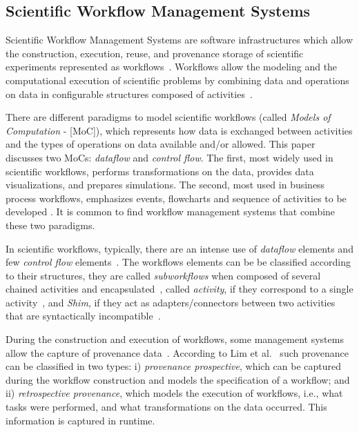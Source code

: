 \documentclass{sig-alternate-05-2015}
\begin{document}
\subsection{Scientific Workflow Management Systems}\label{SISTEMASGERENCIADORESWORKFLOWCIENTIFICO}
Scientific Workflow Management Systems are software infrastructures which allow the construction, execution, reuse, and provenance storage of scientific experiments represented as workflows~\cite{McPhillips2009}. Workflows allow the modeling and the computational execution of scientific problems by combining data and operations on data in configurable structures composed of activities~\cite{Garijo2014}.

There are different paradigms to model scientific workflows (called \emph{Models of Computation} - [MoC]), which represents how data is exchanged between activities and the types of operations on data available and/or allowed. This paper discusses two MoCs: \emph{dataflow} and \emph{control flow}. The first, most widely used in scientific workflows, performs transformations on the data, provides data visualizations, and prepares simulations. The second, most used in business process workflows, emphasizes events, flowcharts and sequence of activities to be developed \cite{Ludascher2006}. It is common to find workflow management systems that combine these two paradigms.

In scientific workflows, typically, there are an intense use of \emph{dataflow} elements and few \emph{control flow} elements~\cite{Ludascher2006}. The workflows elements can be be classified according to their structures, they are called \emph{subworkflows} when composed of several chained activities and encapsulated~\cite{medeiros_woodss_2005}, called \emph{activity}, if they correspond to a single activity~\cite{Garijo2012}, and \emph{Shim}, if they act as adapters/connectors between two activities that are syntactically incompatible~\cite{Lin2009}.

During the construction and execution of workflows, some management systems allow the capture of provenance data~\cite{ Zeng2011}. According to Lim et al.~\cite{Lim2010} such provenance can be classified in two types: i) \emph{provenance prospective}, which can be captured during the workflow construction and models the specification of a workflow; and ii) \emph{retrospective provenance}, which models the execution of workflows, i.e., what tasks were performed, and what transformations on the data occurred. This information is captured in runtime.
\end{document}
